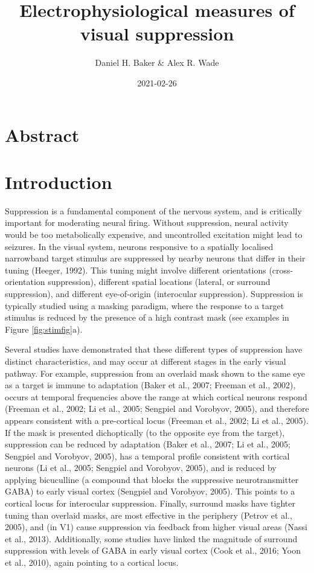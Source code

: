 \documentclass[]{article}
\title{Electrophysiological measures of visual suppression}
\author{Daniel H. Baker \& Alex R. Wade}
\date{2021-02-26}
\begin{document}
\maketitle

\hypertarget{abstract}{%
\section{Abstract}\label{abstract}}

\hypertarget{introduction}{%
\section{Introduction}\label{introduction}}

Suppression is a fundamental component of the nervous system, and is critically important for moderating neural firing. Without suppression, neural activity would be too metabolically expensive, and uncontrolled excitation might lead to seizures. In the visual system, neurons responsive to a spatially localised narrowband target stimulus are suppressed by nearby neurons that differ in their tuning (Heeger, 1992). This tuning might involve different orientations (cross-orientation suppression), different spatial locations (lateral, or surround suppression), and different eye-of-origin (interocular suppression). Suppression is typically studied using a masking paradigm, where the response to a target stimulus is reduced by the presence of a high contrast mask (see examples in Figure \ref{fig:stimfig}a).

Several studies have demonstrated that these different types of suppression have distinct characteristics, and may occur at different stages in the early visual pathway. For example, suppression from an overlaid mask shown to the same eye as a target is immune to adaptation (Baker et al., 2007; Freeman et al., 2002), occurs at temporal frequencies above the range at which cortical neurons respond (Freeman et al., 2002; Li et al., 2005; Sengpiel and Vorobyov, 2005), and therefore appears consistent with a pre-cortical locus (Freeman et al., 2002; Li et al., 2005). If the mask is presented dichoptically (to the opposite eye from the target), suppression can be reduced by adaptation (Baker et al., 2007; Li et al., 2005; Sengpiel and Vorobyov, 2005), has a temporal profile consistent with cortical neurons (Li et al., 2005; Sengpiel and Vorobyov, 2005), and is reduced by applying bicuculline (a compound that blocks the suppressive neurotransmitter GABA) to early visual cortex (Sengpiel and Vorobyov, 2005). This points to a cortical locus for interocular suppression. Finally, surround masks have tighter tuning than overlaid masks, are most effective in the periphery (Petrov et al., 2005), and (in V1) cause suppression via feedback from higher visual areas (Nassi et al., 2013). Additionally, some studies have linked the magnitude of surround suppression with levels of GABA in early visual cortex (Cook et al., 2016; Yoon et al., 2010), again pointing to a cortical locus.
\end{document}
